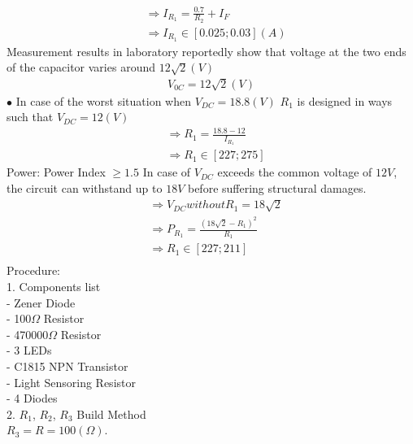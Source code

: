 \documentclass[12pt]{extarticle}
\newcommand{\<}{\langle}
\renewcommand{\>}{\rangle}
\theoremstyle{definition}
\begin{document}
\begin{normalsize}
\begin{align*}
&\Longrightarrow I_{R_1} = \frac{0.7}{R_2} + I_F\\
&\Longrightarrow I_{R_1} \in [0.025 ; 0.03] (A)
\end{align*}
Measurement results in laboratory reportedly show that voltage at the two ends of the capacitor varies around $12\sqrt{2} (V)$ 
\begin{align*}
V_{0C} = 12\sqrt{2} (V)
\end{align*}
$\bullet$ In case of the worst situation when $V_{DC} = 18.8(V)$
$R_1$ is designed in ways such that $V_{DC} = 12 (V)$
\begin{align*}
&\Longrightarrow R_1 = \frac{18.8 - 12}{I_{R_1}}\\
&\Longrightarrow R_1 \in [227 ; 275]
\end{align*}
Power: Power Index $\geq 1.5$
In case of $V_{DC}$ exceeds the common voltage of $12V$, the circuit can withstand up to $18V$ before suffering structural damages.
\begin{align*}
&\Longrightarrow V_{DC} without R_1 = 18\sqrt{2}\\
&\Longrightarrow P_{R_1} = \frac{(18\sqrt{2} - R_1)^2}{R_1}\\
&\Longrightarrow R_1 \in [227 ; 211]\\
\end{align*}
Procedure:\\
1. Components list\\
- Zener Diode\\
- 100$\Omega$ Resistor\\
- 470000$\Omega$ Resistor\\
- 3 LEDs\\
- C1815 NPN Transistor\\
- Light Sensoring Resistor\\
- 4 Diodes\\
2. $R_1$, $R_2$, $R_3$ Build Method\\
$R_3 = R = 100(\Omega)$.\\
\end{normalsize}
\end{document}
